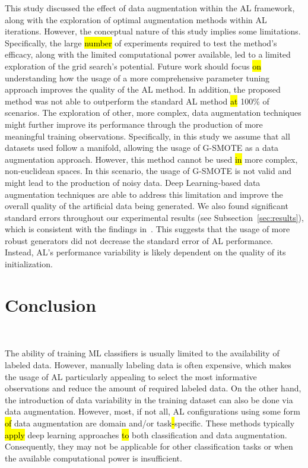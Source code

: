 \documentclass[preprint, 12pt]{elsarticle}
\begin{document}
This study discussed the effect of data augmentation within the AL framework,
along with the exploration of optimal augmentation methods within AL
iterations. However, the conceptual nature of this study implies some
limitations. Specifically, the large \hl{number} of experiments required to
test the method's efficacy, along with the limited computational power
available, led to a limited exploration of the grid search's potential. Future
work should focus \hl{on} understanding how the usage of a more comprehensive
parameter tuning approach improves the quality of the AL method. In addition,
the proposed method was not able to outperform the standard AL method \hl{at}
100\% of scenarios. The exploration of other, more complex, data augmentation
techniques might further improve its performance through the production of
more meaningful training observations. Specifically, in this study we assume
that all datasets used follow a manifold, allowing the usage of G-SMOTE as a
data augmentation approach. However, this method cannot be used \hl{in} more
complex, non-euclidean spaces. In this scenario, the usage of G-SMOTE is not
valid and might lead to the production of noisy data. Deep Learning-based data
augmentation techniques are able to address this limitation and improve the
overall quality of the artificial data being generated. We also found
significant standard errors throughout our experimental results (see
Subsection~\ref{sec:results}), which is consistent with the findings
in~\cite{Fonseca2021, Kottke2017}. This suggests that the usage of more robust
generators did not decrease the standard error of AL performance. Instead,
AL's performance variability is likely dependent on the quality of its
initialization.

\section{Conclusion}~\label{sec:conclusion}

The ability of training ML classifiers is usually limited to the availability
of labeled data. However, manually labeling data is often expensive, which
makes the usage of AL particularly appealing to select the most informative
observations and reduce the amount of required labeled data. On the other
hand, the introduction of data variability in the training dataset can also be
done via data augmentation. However, most, if not all, AL configurations using
some form \hl{of} data augmentation are domain and/or task\hl{-}specific.
These methods typically \hl{apply} deep learning approaches \hl{to} both
classification and data augmentation. Consequently, they may not be applicable
for other classification tasks or when the available computational power is
insufficient.
\end{document}
